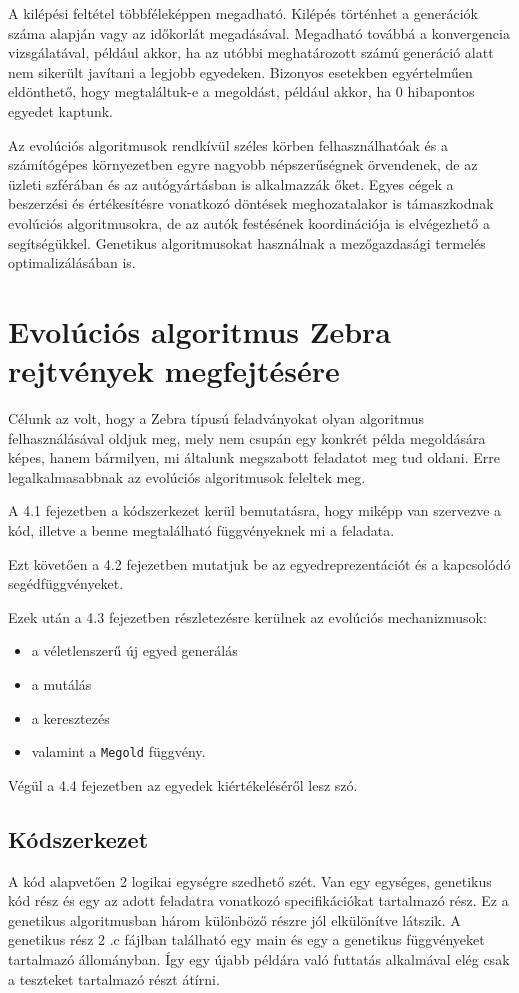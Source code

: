 \documentclass[12pt,a4paper,oneside]{report}
\begin{document}
A kilépési feltétel többféleképpen megadható. Kilépés történhet a generációk száma alapján vagy az időkorlát megadásával. Megadható továbbá a konvergencia vizsgálatával, például akkor, ha az utóbbi meghatározott számú generáció alatt nem sikerült javítani a legjobb egyedeken. Bizonyos esetekben egyértelműen eldönthető, hogy megtaláltuk-e a megoldást, például akkor, ha 0 hibapontos egyedet kaptunk.

Az evolúciós algoritmusok rendkívül széles körben felhasználhatóak és a számítógépes környezetben egyre nagyobb népszerűségnek örvendenek, de az üzleti szférában és az autógyártásban is alkalmazzák őket. Egyes cégek a beszerzési és értékesítésre vonatkozó döntések meghozatalakor is támaszkodnak evolúciós algoritmusokra, de az autók festésének koordinációja is elvégezhető a segítségükkel. Genetikus algoritmusokat használnak a mezőgazdasági termelés optimalizálásában is.

\chapter{Evolúciós algoritmus Zebra rejtvények megfejtésére} %
	Célunk az volt, hogy a Zebra típusú feladványokat olyan algoritmus felhasználásával oldjuk meg, mely nem csupán egy konkrét példa megoldására képes, hanem bármilyen, mi általunk megszabott feladatot meg tud oldani.
    Erre legalkalmasabbnak az evolúciós algoritmusok feleltek meg.

	{A 4.1 fejezetben a kódszerkezet kerül bemutatásra, hogy miképp van szervezve a kód, illetve a benne megtalálható függvényeknek mi a feladata.}

	{Ezt követően a 4.2 fejezetben mutatjuk be az egyedreprezentációt és a kapcsolódó segédfüggvényeket.}

	{Ezek után a 4.3 fejezetben részletezésre kerülnek az evolúciós mechanizmusok:}

	\begin{itemize}
	\item a véletlenszerű új egyed generálás
	\item a mutálás
	\item a keresztezés
	\item  valamint a \texttt{Megold} függvény.
	\end{itemize}

	{Végül a 4.4 fejezetben az egyedek kiértékeléséről lesz szó.}


    \section{Kódszerkezet} %
		A kód alapvetően 2 logikai egységre szedhető szét.
		Van egy egységes, genetikus kód rész és egy az adott feladatra vonatkozó specifikációkat tartalmazó rész.
		Ez a genetikus algoritmusban három különböző részre jól elkülönítve látszik.
		A genetikus rész 2 .c fájlban található egy main és egy a genetikus függvényeket tartalmazó állományban.
		Így egy újabb példára való futtatás alkalmával elég csak a teszteket tartalmazó részt átírni.
		
\end{document}
